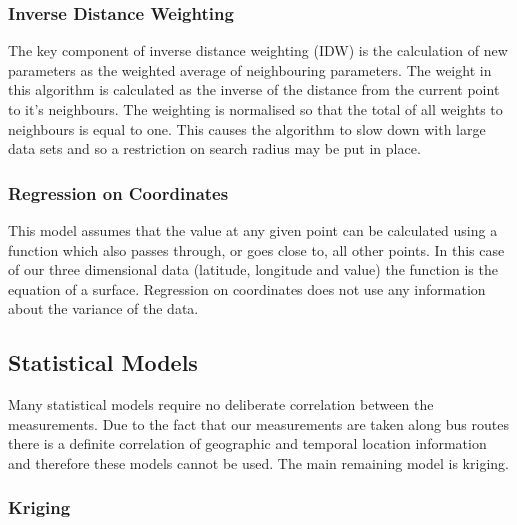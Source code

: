 \subsubsection{Inverse Distance Weighting}\label{inverseweight}

The key component of inverse distance weighting (IDW) is the calculation of new parameters as the weighted average of neighbouring parameters. The weight in this algorithm is calculated as the inverse of the distance from the current point to it's neighbours. The weighting is normalised so that the total of all weights to neighbours is equal to one. This causes the algorithm to slow down with large data sets and so a restriction on search radius may be put in place. 


\subsubsection{Regression on Coordinates}\label{regressiononcoordinates}

This model assumes that the value at any given point can be calculated using a function which also passes through, or goes close to, all other points. In this case of our three dimensional data (latitude, longitude and value) the function is the equation of a surface. Regression on coordinates does not use any information about the variance of the data. 

\subsection{Statistical Models}\label{statisticalmodels}

Many statistical models require no deliberate correlation between the measurements. Due to the fact that our measurements are taken along bus routes there is a definite correlation of geographic and temporal location information and therefore these models cannot be used. The main remaining model is kriging.

\subsubsection{Kriging}


